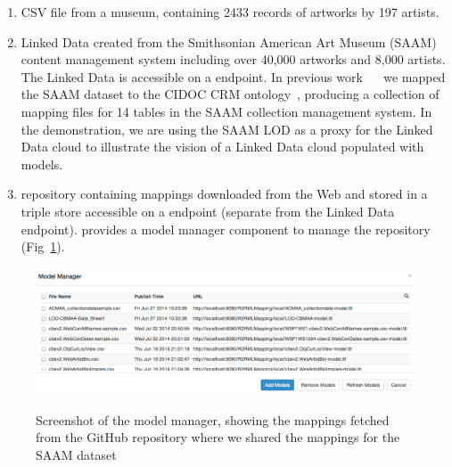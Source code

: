 \begin{enumerate}
\item CSV file from a museum, containing 2433 records of artworks by 197 artists.

\item Linked Data created from the Smithsonian American Art Museum (SAAM) content management system including over 40,000 artworks and 8,000 artists. 
The Linked Data is accessible on a \sparql endpoint.
In previous work~\cite{Szekely:2013vq} ~ we mapped the SAAM dataset to the CIDOC CRM ontology~\cite{Doerr:2003:CCR:958671.958678}, producing a collection of \rtworml mapping files for 14 tables in the SAAM collection management system.
In the demonstration, we are using the SAAM LOD as a proxy for the Linked Data cloud to illustrate the vision of a Linked Data cloud populated with \rtworml models.

\item \rtworml repository containing \rtworml mappings downloaded from the Web and stored in a triple store accessible on a \sparql endpoint (separate from the Linked Data endpoint).
\karma provides a model manager component to manage the \rtworml repository (Fig~\ref{fig:model-manager-screenshot}).
\end{enumerate}
%

\begin{figure}[bth]
\begin{center}
\includegraphics[width=4.8in]{images/3-model-manager.png}
\vspace{-3mm}
\caption{Screenshot of the model manager, showing the \rtworml mappings fetched from the GitHub repository where we shared the mappings for the SAAM dataset }
\vspace{-2mm}
\label{fig:model-manager-screenshot}
\end{center}
\vspace{-1.5em}
\end{figure}
